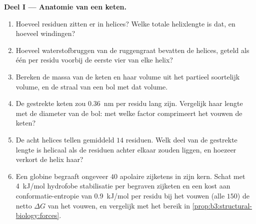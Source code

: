 \begin{problem}
\medskip
\noindent\textbf{Deel I --- Anatomie van een keten.}
\begin{enumerate}
  \item Hoeveel residuen zitten er in helices? Welke totale helixlengte
        is dat, en hoeveel windingen?
  \item Hoeveel waterstofbruggen van de ruggengraat bevatten de
        helices, geteld als één per residu voorbij de eerste vier van
        elke helix?
  \item Bereken de massa van de keten en haar volume uit het partieel
        soortelijk volume, en de straal van een bol met dat volume.
  \item De gestrekte keten zou \qty{0.36}{nm} per residu lang zijn.
        Vergelijk haar lengte met de diameter van de bol: met welke
        factor comprimeert het vouwen de keten?
  \item De acht helices tellen gemiddeld $14$ residuen. Welk deel van
        de gestrekte lengte is helicaal als de residuen achter elkaar
        zouden liggen, en hoezeer verkort de helix haar?
  \item Een globine begraaft ongeveer $40$ apolaire zijketens in zijn
        kern. Schat met \qty{4}{kJ/mol} hydrofobe stabilisatie per
        begraven zijketen en een kost aan conformatie-entropie van
        \qty{0.9}{kJ/mol} per residu bij het vouwen (alle $150$) de
        netto $\Delta G$ van het vouwen, en vergelijk met het bereik in
        \cref{prop:b3:structural-biology:forces}.
\end{enumerate}


\end{problem}

